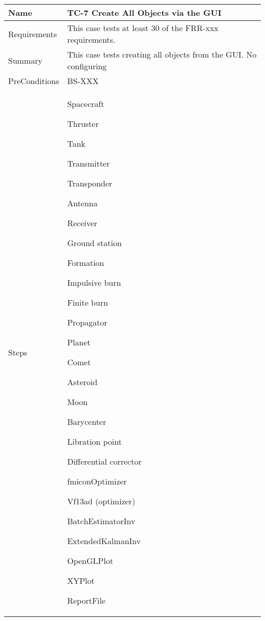 \begin{table}[htbp!]
\centering
      \begin{tabular}{|p{1.05 in} |p{4.75 in} |}
      \hline
         \rowcolor[rgb]{0.8,0.8,0.8} Name & TC-7 Create All Objects via the GUI\\
         \hline
         Requirements & This case tests at least 30 of the FRR-xxx requirements.\\  \hline
         Summary & This case tests creating all objects from the GUI.  No configuring\\  \hline
         PreConditions & BS-XXX\\     \hline
         Steps &
         \begin{compactenum}
             \item Spacecraft
             \item Thruster
             \item Tank
             \item Transmitter
             \item Transponder
             \item Antenna
             \item Receiver
             \item Ground station
             \item Formation
             \item Impulsive burn
             \item Finite burn
             \item Propagator
             \item Planet
             \item Comet
             \item Asteroid
             \item Moon
             \item Barycenter
             \item Libration point
             \item Differential corrector
             \item fmiconOptimizer
             \item Vf13ad (optimizer)
             \item BatchEstimatorInv
             \item ExtendedKalmanInv
             \item OpenGLPlot
             \item XYPlot
             \item ReportFile

\end{compactenum}
\end{tabular}
\end{table}
